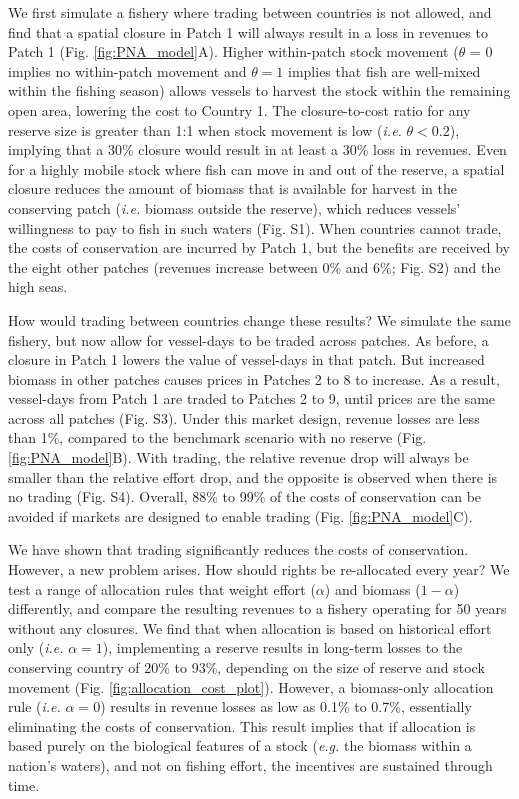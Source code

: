 \documentclass[12pt]{article}
\begin{document}
We first simulate a fishery where trading between countries is not allowed, and find that a spatial closure in Patch 1 will always result in a loss in revenues to Patch 1 (Fig. \ref{fig:PNA_model}A). Higher within-patch stock movement ($\theta$ = 0 implies no within-patch movement and $\theta = 1$ implies that fish are well-mixed within the fishing season) allows vessels to harvest the stock within the remaining open area, lowering the cost to Country 1. The closure-to-cost ratio for any reserve size is greater than 1:1 when stock movement is low (\emph{i.e.} $\theta < 0.2$), implying that a 30\% closure would result in at least a 30\% loss in revenues. Even for a highly mobile stock where fish can move in and out of the reserve, a spatial closure reduces the amount of biomass that is available for harvest in the conserving patch (\emph{i.e.} biomass outside the reserve), which reduces vessels' willingness to pay to fish in such waters (Fig. S1). When countries cannot trade, the costs of conservation are incurred by Patch 1, but the benefits are received by the eight other patches (revenues increase between 0\% and 6\%; Fig. S2) and the high seas.

How would trading between countries change these results? We simulate the same fishery, but now allow for vessel-days to be traded across patches. As before, a closure in Patch 1 lowers the value of vessel-days in that patch. But increased biomass in other patches causes prices in Patches 2 to 8 to increase. As a result, vessel-days from Patch 1 are traded to Patches 2 to 9, until prices are the same across all patches (Fig. S3). Under this market design, revenue losses are less than 1\%, compared to the benchmark scenario with no reserve (Fig. \ref{fig:PNA_model}B). With trading, the relative revenue drop will always be smaller than the relative effort drop, and the opposite is observed when there is no trading (Fig. S4). Overall, 88\% to 99\% of the costs of conservation can be avoided if markets are designed to enable trading (Fig. \ref{fig:PNA_model}C).

We have shown that trading significantly reduces the costs of conservation. However, a new problem arises. How should rights be re-allocated every year? We test a range of allocation rules that weight effort ($\alpha$) and biomass ($1 - \alpha$) differently, and compare the resulting revenues to a fishery operating for 50 years without any closures. We find that when allocation is based on historical effort only (\emph{i.e.} $\alpha = 1$), implementing a reserve results in long-term losses to the conserving country of 20\% to 93\%, depending on the size of reserve and stock movement (Fig. \ref{fig:allocation_cost_plot}). However, a biomass-only allocation rule (\emph{i.e.} $\alpha = 0$) results in revenue losses as low as 0.1\% to 0.7\%, essentially eliminating the costs of conservation. This result implies that if allocation is based purely on the biological features of a stock (\emph{e.g.} the biomass within a nation's waters), and not on fishing effort, the incentives are sustained through time. 
\end{document}
